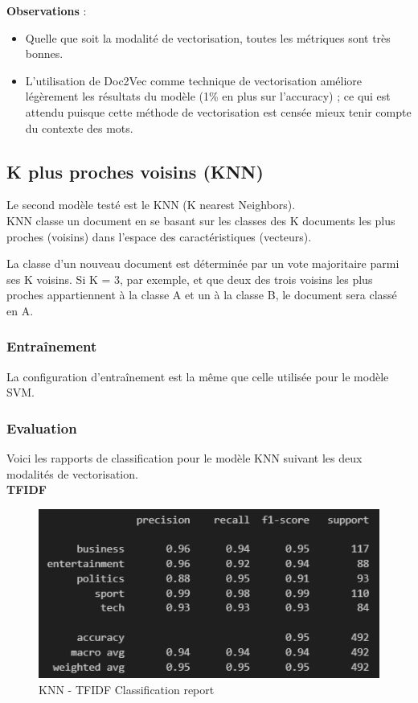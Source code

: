 \documentclass[a4paper,12pt]{article}
\begin{document}
\textbf{Observations} :
\begin{itemize}
    \item Quelle que soit la modalité de vectorisation, toutes les métriques sont très bonnes.
    \item L'utilisation de Doc2Vec comme technique de vectorisation améliore légèrement les résultats du modèle (1\% en plus sur l'accuracy) ; ce qui est attendu puisque cette méthode de vectorisation est censée mieux tenir compte du contexte des mots.
\end{itemize}

\subsection{K plus proches voisins (KNN)}

Le second modèle testé est le KNN (K nearest Neighbors).\\

KNN classe un document en se basant sur les classes des K documents les plus proches (voisins) dans l'espace des caractéristiques (vecteurs).

La classe d'un nouveau document est déterminée par un vote majoritaire parmi ses K voisins. Si K = 3, par exemple, et que deux des trois voisins les plus proches appartiennent à la classe A et un à la classe B, le document sera classé en A.\\

\subsubsection{Entraînement}

La configuration d'entraînement est la même que celle utilisée pour le modèle SVM.

\subsubsection{Evaluation}

Voici les rapports de classification pour le modèle KNN suivant les deux modalités de vectorisation.\\

\textbf{TFIDF}\\

\begin{figure}[H]
  \centering
  \includegraphics{images/knn_tfidf.png} 
  \caption{KNN - TFIDF Classification report}
  \label{fig:knntfidf}
\end{figure}
\end{document}
